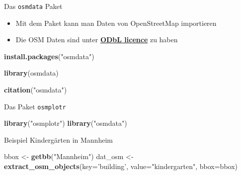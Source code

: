 \documentclass[ignorenonframetext,]{beamer}
\newenvironment{Shaded}{\begin{snugshade}}{\end{snugshade}}
\newcommand{\KeywordTok}[1]{\textcolor[rgb]{0.13,0.29,0.53}{\textbf{#1}}}
\newcommand{\DataTypeTok}[1]{\textcolor[rgb]{0.13,0.29,0.53}{#1}}
\newcommand{\StringTok}[1]{\textcolor[rgb]{0.31,0.60,0.02}{#1}}
\newcommand{\NormalTok}[1]{#1}
\providecommand{\tightlist}{%
  \setlength{\itemsep}{0pt}\setlength{\parskip}{0pt}}
\begin{document}
\begin{frame}[fragile]{Das \texttt{osmdata} Paket}

\begin{itemize}
\tightlist
\item
  Mit dem Paket kann man Daten von OpenStreetMap importieren
\item
  Die OSM Daten sind unter
  \href{https://www.openstreetmap.org/copyright}{\textbf{ODbL licence}}
  zu haben
\end{itemize}

\begin{Shaded}
\begin{Highlighting}[]
\KeywordTok{install.packages}\NormalTok{(}\StringTok{"osmdata"}\NormalTok{)}
\end{Highlighting}
\end{Shaded}

\begin{Shaded}
\begin{Highlighting}[]
\KeywordTok{library}\NormalTok{(osmdata)}
\end{Highlighting}
\end{Shaded}

\begin{Shaded}
\begin{Highlighting}[]
\KeywordTok{citation}\NormalTok{(}\StringTok{"osmdata"}\NormalTok{)}
\end{Highlighting}
\end{Shaded}

\end{frame}

\begin{frame}[fragile]{Das Paket \texttt{osmplotr}}

\begin{Shaded}
\begin{Highlighting}[]
\KeywordTok{library}\NormalTok{(}\StringTok{"osmplotr"}\NormalTok{)}
\KeywordTok{library}\NormalTok{(}\StringTok{"osmdata"}\NormalTok{)}
\end{Highlighting}
\end{Shaded}

\end{frame}

\begin{frame}[fragile]{Beispiel Kindergärten in Mannheim}

\begin{Shaded}
\begin{Highlighting}[]
\NormalTok{bbox <-}\StringTok{ }\KeywordTok{getbb}\NormalTok{(}\StringTok{"Mannheim"}\NormalTok{)}
\NormalTok{dat_osm <-}\StringTok{ }\KeywordTok{extract_osm_objects}\NormalTok{(}\DataTypeTok{key=}\StringTok{'building'}\NormalTok{, }
                              \DataTypeTok{value=}\StringTok{"kindergarten"}\NormalTok{,}
                              \DataTypeTok{bbox=}\NormalTok{bbox)}
\end{Highlighting}
\end{Shaded}

\end{frame}
\end{document}

